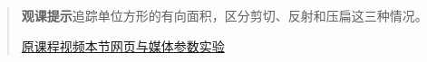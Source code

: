 \begin{quote}\small\textbf{观课提示}\quad 追踪单位方形的有向面积，区分剪切、反射和压扁这三种情况。

\href{https://www.youtube.com/watch?v=Ip3X9LOh2dk}{原课程视频}\quad\href{https://vitael04213.github.io/3blue1brown-notes/lessons/determinant.html}{本节网页与媒体}\quad\href{https://vitael04213.github.io/3blue1brown-notes/lab.html\#linear}{参数实验}
\end{quote}
